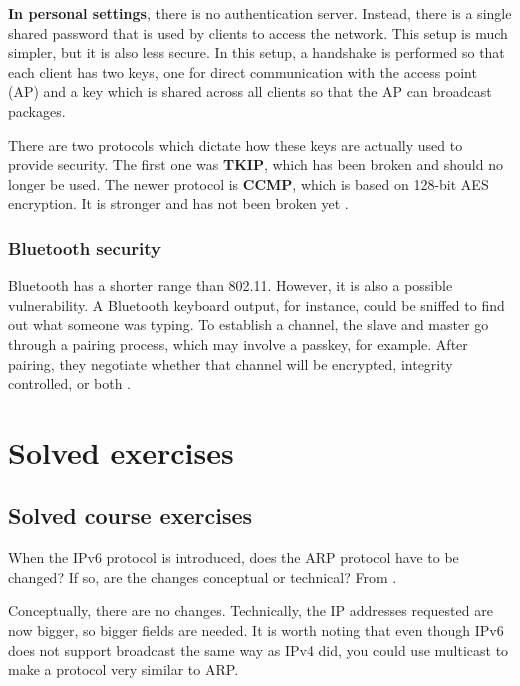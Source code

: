 \textbf{In personal settings}, there is no authentication server. Instead, there is a single shared password that is used by clients to access the network. This setup is much simpler, but it is also less secure. In this setup, a handshake is performed so that each client has two keys, one for direct communication with the access point (AP) and a key which is shared across all clients so that the AP can broadcast packages.

There are two protocols which dictate how these keys are actually used to provide security.
The first one was \textbf{TKIP}, which has been broken and should no longer be used.
The newer protocol is \textbf{CCMP}, which is based on 128-bit AES encryption. It is stronger and has not been broken yet \cite[p.~825]{computer-networks-tanenbaum-2012}.

\subsubsection{Bluetooth security}

Bluetooth has a shorter range than 802.11. However, it is also a possible vulnerability.
A Bluetooth keyboard output, for instance, could be sniffed to find out what someone was typing.
To establish a channel, the slave and master go through a pairing process, which may involve a passkey, for example.
After pairing, they negotiate whether that channel will be encrypted, integrity controlled, or both \cite[p.~827]{computer-networks-tanenbaum-2012}.

\section{Solved exercises}

\subsection{Solved course exercises}
\setcounter{Exercise}{0}

\begin{Exercise}
When the IPv6 protocol is introduced, does the ARP protocol have to be changed?
If so, are the changes conceptual or technical?
From \cite{computer-networks-tanenbaum-2012}.
\end{Exercise}
\begin{Answer}
Conceptually, there are no changes.
Technically, the IP addresses requested are now bigger, so bigger fields are needed.
It is worth noting that even though IPv6 does not support broadcast the same way as IPv4 did, you could use multicast to make a protocol very similar to ARP.
\end{Answer}

